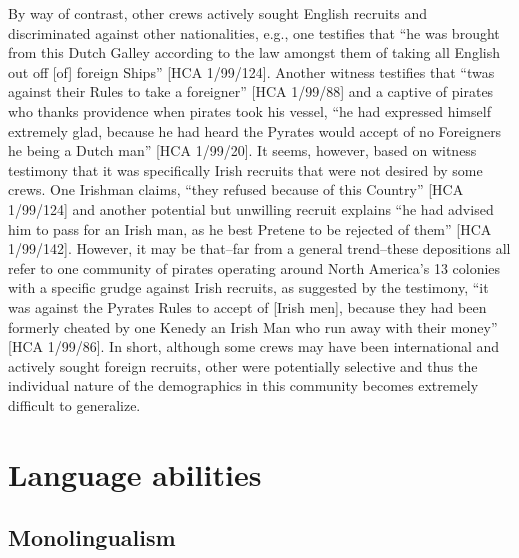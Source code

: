 By way of contrast, other  crews actively sought English recruits and discriminated against other nationalities, e.g., one  testifies that “he was brought from this Dutch Galley according to the law amongst them of taking all English out off [of]   foreign Ships” [HCA 1/99/124]. Another witness testifies that “twas against their Rules to take a foreigner” [HCA 1/99/88] and a captive of pirates who thanks providence when pirates took his vessel, “he had expressed himself extremely glad, because he had heard the Pyrates would accept of no Foreigners he being a Dutch man” [HCA 1/99/20]. It seems, however, based on witness testimony that it was specifically Irish recruits that were not desired by some  crews. One Irishman claims, “they refused because of this Country” [HCA 1/99/124] and another potential but unwilling recruit explains “he had advised him to pass for an Irish man, as he best Pretene to be rejected of them” [HCA 1/99/142]. However, it may be that–far from a general trend–these depositions all refer to one community of pirates operating around North America’s 13 colonies with a specific grudge against Irish recruits, as suggested by the testimony, “it was against the Pyrates Rules to accept of [Irish men], because they had been formerly cheated by one Kenedy an Irish Man who run away with their money” [HCA 1/99/86]. In short, although some  crews may have been international and actively sought foreign recruits, other were potentially selective and thus the individual nature of the  demographics in this community becomes extremely difficult to generalize.  

\section{{Language abilities} }\label{sec:3.10}

\subsection{{Monolingualism}}\label{sec:3.10.1}

